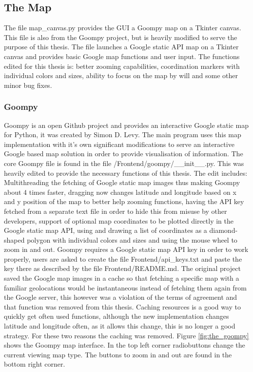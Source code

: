 \subsection{The Map}
The file map\_canvas.py provides the GUI a Goompy\cite{goompy} map on a Tkinter canvas. This file is also from the Goompy project, but is heavily modified to serve the purpose of this thesis. The file launches a Google static API map on a Tkinter canvas and provides basic Google map functions and user input. The functions edited for this thesis is: better zooming capabilities, coordination markers with individual colors and sizes, ability to focus on the map by will and some other minor bug fixes.

\subsubsection{Goompy}
Goompy\cite{goompy} is an open Github project and provides an interactive Google static map\cite{googleSM} for Python, it was created by Simon D. Levy. The main program uses this map implementation with it's own significant modifications to serve an interactive Google based map solution in order to provide visualisation of information. The core Goompy file is found in the file /Frontend/goompy/\_\_init\_\_.py. This was heavily edited to provide the necessary functions of this thesis. The edit includes: Multithreading the fetching of Google static map images thus making Goompy about 4 times faster, dragging now changes latitude and longitude based on x and y position of the map to better help zooming functions, having the API key fetched from a separate text file in order to hide this from misuse by other developers, support of optional map coordinates to be plotted directly in the Google static map API, using and drawing a list of coordinates as a diamond-shaped polygon with individual colors and sizes and using the mouse wheel to zoom in and out. Goompy requires a Google static map API key in order to work properly, users are asked to create the file Frontend/api\_keys.txt and paste the key there as described by the file Frontend/README.md. The original project saved the Google map images in a cache so that fetching a specific map with a familiar geolocations would be instantaneous instead of fetching them again from the Google server, this however was a violation of the terms of agreement and that function was removed from this thesis. Caching resources is a good way to quickly get often used functions, although the new implementation changes latitude and longitude often, as it allows this change, this is no longer a good strategy. For these two reasons the caching was removed.
Figure \ref{fig:the_goompy} shows the Goompy map interface. In the top left corner radiobuttons change the current viewing map type. The buttons to zoom in and out are found in the bottom right corner.

